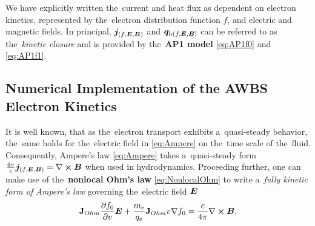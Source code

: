 We have explicitly written the~current and heat flux as dependent on
electron kinetics, represented by the~electron distribution function $f$,
and electric and magnetic fields. In principal, $\boldsymbol{j}_{(f, \boldsymbol{E}, \boldsymbol{B})}$
and $\boldsymbol{q}_{h(f, \boldsymbol{E}, \boldsymbol{B})}$ can be referred to as the~\textit{kinetic closure}
and is provided by the~{\bf AP1 model} \eqref{eq:AP1f0} and \eqref{eq:AP1f1}.

\subsection{Numerical Implementation of the AWBS Electron Kinetics}
\label{sec:Numerics}

It is well known, that as the~electron transport exhibits a~quasi-steady
behavior, the~same holds for the~electric field in \eqref{eq:Ampere} on 
the~time scale of the~fluid. Consequently, Ampere's law \eqref{eq:Ampere} 
takes a~quasi-steady form 
$\frac{4\pi}{c} \boldsymbol{j}_{(f, \boldsymbol{E}, \boldsymbol{B})} = \nabla\boldsymbol{\times}\boldsymbol{B}$
when used in hydrodynamics. Proceeding further, one can make use of 
the~{\bf nonlocal Ohm's law} \eqref{eq:NonlocalOhm} to write 
a~\textit{fully kinetic form of Ampere's law} 
governing the~electric field $\boldsymbol{E}$
\begin{equation}
  \mathbf{J}_{Ohm}\frac{\partial{f_0}}{\partial{v}}\boldsymbol{E} 
  + \frac{m_e}{q_e} \mathbf{J}_{Ohm}v \nabla f_0 = 
  \frac{c}{4\pi} \nabla\boldsymbol{\times}\boldsymbol{B} 
  .
  \label{eq:AmpereKinetic}
\end{equation}

